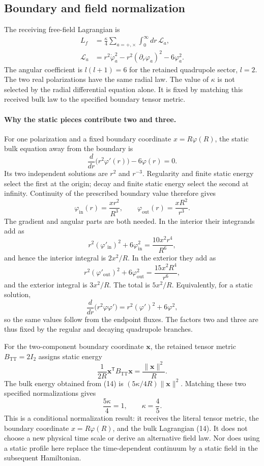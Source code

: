 \documentclass[10pt,twocolumn,letterpaper]{article}
\begin{document}
\subsection{Boundary and field normalization}
The receiving free-field Lagrangian is
\begin{equation}
\begin{aligned}
L_f &= \frac{\kappa}{4}\sum_{a=+,\times}\int_0^\infty dr\,\mathcal L_a,\\
\mathcal L_a &= r^2\dot\varphi_a^2-r^2(\partial_r\varphi_a)^2-6\varphi_a^2.
\end{aligned}\tag{14}
\end{equation}
The angular coefficient is $l(l+1)=6$ for the retained quadrupole
sector, $l=2$.  The two real polarizations have the same radial law.
The value of $\kappa$ is not selected by the radial differential
equation alone.  It is fixed by matching this received bulk law to the
specified boundary tensor metric.

\paragraph{Why the static pieces contribute two and three.}
For one polarization and a fixed boundary coordinate
$x=R\varphi(R)$, the static bulk equation away from the boundary is
\[
\frac{d}{dr}\bigl(r^2\varphi'(r)\bigr)-6\varphi(r)=0.
\]
Its two independent solutions are $r^2$ and $r^{-3}$.
Regularity and finite static energy select the first at the origin;
decay and finite static energy select the second at infinity.
Continuity of the prescribed boundary value therefore gives
\[
\varphi_{\mathrm{in}}(r)=\frac{xr^2}{R^3},
\qquad
\varphi_{\mathrm{out}}(r)=\frac{xR^2}{r^3}.
\]
The gradient and angular parts are both needed.  In the interior their
integrands add as
\[
r^2(\varphi'_{\mathrm{in}})^2+6\varphi_{\mathrm{in}}^2
=\frac{10x^2r^4}{R^6},
\]
and hence the interior integral is $2x^2/R$.  In the exterior they add as
\[
r^2(\varphi'_{\mathrm{out}})^2+6\varphi_{\mathrm{out}}^2
=\frac{15x^2R^4}{r^6},
\]
and the exterior integral is $3x^2/R$.  The total is $5x^2/R$.
Equivalently, for a static solution,
\[
\frac{d}{dr}\bigl(r^2\varphi\varphi'\bigr)
=r^2(\varphi')^2+6\varphi^2,
\]
so the same values follow from the endpoint fluxes.  The factors two and
three are thus fixed by the regular and decaying quadrupole branches.

For the two-component boundary coordinate $\mathbf x$, the retained
tensor metric $B_{\mathrm{TT}}=2I_2$ assigns static energy
\[
\frac{1}{2R}\mathbf x^{\mathsf T}B_{\mathrm{TT}}\mathbf x
=\frac{\|\mathbf x\|^2}{R}.
\]
The bulk energy obtained from (14) is
$(5\kappa/4R)\|\mathbf x\|^2$.  Matching these two specified
normalizations gives
\begin{equation}
\frac{5\kappa}{4}=1,\qquad \kappa=\frac45.\tag{15}
\end{equation}
This is a conditional normalization result: it receives the literal
tensor metric, the boundary coordinate $x=R\varphi(R)$, and the bulk
Lagrangian (14).  It does not choose a new physical time scale or derive
an alternative field law.  Nor does using a static profile here replace
the time-dependent continuum by a static field in the subsequent
Hamiltonian.
\end{document}
